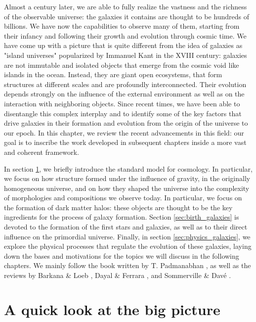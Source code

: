 \vspace{6pt}

Almost a century later, we are able to fully realize the vastness and the richness of the observable universe: the galaxies it contains are thought to be hundreds of billions. We have now the capabilities to observe many of them, starting from their infancy and following their growth and evolution through cosmic time. We have come up with a picture that is quite different from the idea of galaxies as "island universes" popularized by Immanuel Kant in the XVIII century: galaxies are not immutable and isolated objects that emerge from the cosmic void like islands in the ocean. Instead, they are giant open ecosystems, that form structures at different scales and are profoundly interconnected. Their evolution depends strongly on the influence of the external environment as well as on the interaction with neighboring objects. Since recent times, we have been able to disentangle this complex interplay and to identify some of the key factors that drive galaxies in their formation and evolution from the origin of the universe to our epoch. In this chapter, we review the recent advancements in this field: our goal is to inscribe the work developed in subsequent chapters inside a more vast and coherent framework.

\vspace{6pt}

In section \ref{sec:intro_cosmo}, we briefly introduce the standard model for cosmology. In particular, we focus on how structure formed under the influence of gravity, in the originally homogeneous universe, and on how they shaped the universe into the complexity of morphologies and compositions we observe today. In particular, we focus on the formation of dark matter halos: these objects are thought to be the key ingredients for the process of galaxy formation. Section \ref{sec:birth_galaxies} is devoted to the formation of the first stars and galaxies, as well as to their direct influence on the primordial universe. Finally, in section \ref{sec:physics_galaxies}, we explore the physical processes that regulate the evolution of these galaxies, laying down the bases and motivations for the topics we will discuss in the following chapters. We mainly follow the book written by T. Padmanabhan \citep{padmanabhan_book}, as well as the reviews by Barkana \& Loeb \citep{Barkana:2000fd}, Dayal \& Ferrara \citep{Dayal:2018hft}, and Sommerville \& Davé \citep{somerville2015physical}.

\section{A quick look at the big picture} \label{sec:intro_cosmo}
 
